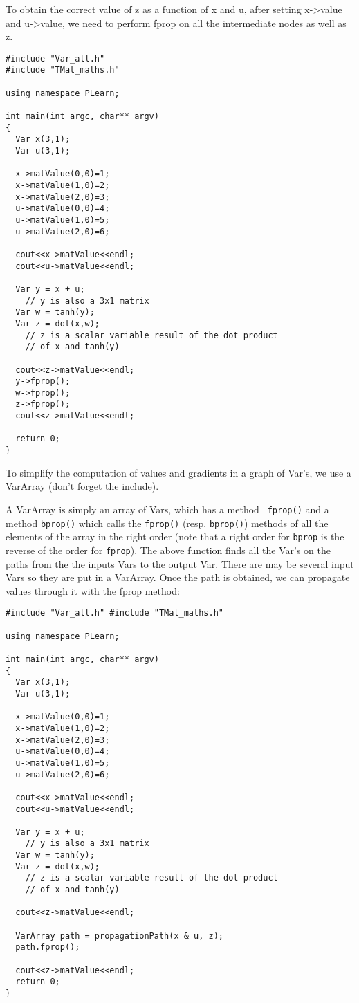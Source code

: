 \documentclass[11pt]{book}
\begin{document}
 To obtain the correct value of z as a function of x and u, after setting x->value and u->value, we need to perform fprop on all the intermediate nodes as well as z. 

\begin{verbatim}
#include "Var_all.h"
#include "TMat_maths.h"

using namespace PLearn;

int main(int argc, char** argv)
{
  Var x(3,1);
  Var u(3,1);

  x->matValue(0,0)=1;
  x->matValue(1,0)=2;
  x->matValue(2,0)=3;
  u->matValue(0,0)=4;
  u->matValue(1,0)=5;
  u->matValue(2,0)=6;

  cout<<x->matValue<<endl;
  cout<<u->matValue<<endl;

  Var y = x + u;
    // y is also a 3x1 matrix
  Var w = tanh(y);
  Var z = dot(x,w);
    // z is a scalar variable result of the dot product 
    // of x and tanh(y)

  cout<<z->matValue<<endl;
  y->fprop();
  w->fprop();
  z->fprop();
  cout<<z->matValue<<endl;

  return 0;
}
\end{verbatim}

 To simplify the computation of values and gradients in a graph of
Var's, we use a VarArray (don't forget the include).

 A VarArray is simply an array of Vars, which has a method {\tt
fprop()} and a method {\tt bprop()} which calls the {\tt fprop()}
(resp. {\tt bprop()}) methods of all the elements of the array in the
right order (note that a right order for {\tt bprop} is the reverse of
the order for {\tt fprop}). The above function finds all the Var's on
the paths from the the inputs Vars to the output Var. There are may
be several input Vars so they are put in a VarArray. Once the path
is obtained, we can propagate values through it with the fprop method:

\begin{verbatim}
#include "Var_all.h" #include "TMat_maths.h"

using namespace PLearn;

int main(int argc, char** argv)
{
  Var x(3,1);
  Var u(3,1);

  x->matValue(0,0)=1;
  x->matValue(1,0)=2;
  x->matValue(2,0)=3;
  u->matValue(0,0)=4;
  u->matValue(1,0)=5;
  u->matValue(2,0)=6;

  cout<<x->matValue<<endl;
  cout<<u->matValue<<endl;

  Var y = x + u;
    // y is also a 3x1 matrix
  Var w = tanh(y);
  Var z = dot(x,w);
    // z is a scalar variable result of the dot product
    // of x and tanh(y)

  cout<<z->matValue<<endl;

  VarArray path = propagationPath(x & u, z);
  path.fprop();

  cout<<z->matValue<<endl;
  return 0;
}
\end{verbatim}
\end{document}
